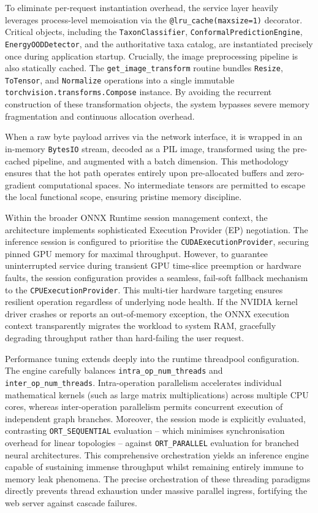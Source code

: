 To eliminate per-request instantiation overhead, the service layer heavily leverages process-level memoisation via the \texttt{@lru\_cache(maxsize=1)} decorator. Critical objects, including the \texttt{TaxonClassifier}, \texttt{ConformalPredictionEngine}, \texttt{EnergyOODDetector}, and the authoritative taxa catalog, are instantiated precisely once during application startup. Crucially, the image preprocessing pipeline is also statically cached. The \texttt{get\_image\_transform} routine bundles \texttt{Resize}, \texttt{ToTensor}, and \texttt{Normalize} operations into a single immutable \texttt{torchvision.transforms.Compose} instance. By avoiding the recurrent construction of these transformation objects, the system bypasses severe memory fragmentation and continuous allocation overhead.

When a raw byte payload arrives via the network interface, it is wrapped in an in-memory \texttt{BytesIO} stream, decoded as a PIL image, transformed using the pre-cached pipeline, and augmented with a batch dimension. This methodology ensures that the hot path operates entirely upon pre-allocated buffers and zero-gradient computational spaces. No intermediate tensors are permitted to escape the local functional scope, ensuring pristine memory discipline.

Within the broader ONNX Runtime session management context, the architecture implements sophisticated Execution Provider (EP) negotiation. The inference session is configured to prioritise the \texttt{CUDAExecutionProvider}, securing pinned GPU memory for maximal throughput. However, to guarantee uninterrupted service during transient GPU time-slice preemption or hardware faults, the session configuration provides a seamless, fail-soft fallback mechanism to the \texttt{CPUExecutionProvider}. This multi-tier hardware targeting ensures resilient operation regardless of underlying node health. If the NVIDIA kernel driver crashes or reports an out-of-memory exception, the ONNX execution context transparently migrates the workload to system RAM, gracefully degrading throughput rather than hard-failing the user request.

Performance tuning extends deeply into the runtime threadpool configuration. The engine carefully balances \texttt{intra\_op\_num\_threads} and \texttt{inter\_op\_num\_threads}. Intra-operation parallelism accelerates individual mathematical kernels (such as large matrix multiplications) across multiple CPU cores, whereas inter-operation parallelism permits concurrent execution of independent graph branches. Moreover, the session mode is explicitly evaluated, contrasting \texttt{ORT\_SEQUENTIAL} evaluation -- which minimises synchronisation overhead for linear topologies -- against \texttt{ORT\_PARALLEL} evaluation for branched neural architectures. This comprehensive orchestration yields an inference engine capable of sustaining immense throughput whilst remaining entirely immune to memory leak phenomena. The precise orchestration of these threading paradigms directly prevents thread exhaustion under massive parallel ingress, fortifying the web server against cascade failures.

